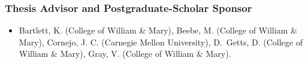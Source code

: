 
\subsubsection*{Thesis Advisor and Postgraduate-Scholar Sponsor}
\begin{itemize}
 \item Bartlett, K. (College of William \& Mary), Beebe, M. (College of William \& Mary), Cornejo, J. C. (Carnegie Mellon University), D.~Getts, D. (College of William \& Mary), Gray, V. (College of William \& Mary).
\end{itemize}

